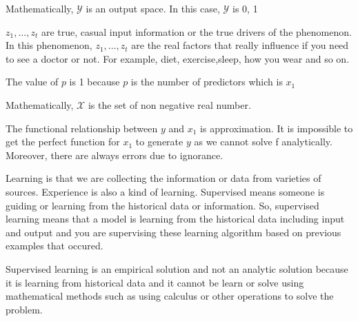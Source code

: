 \documentclass[12pt]{article}
\begin{document}
\begin{enumerate}
Mathematically, $\mathcal{Y}$ is an output space. In this case, $\mathcal{Y}$ is {0, 1}


$z_1, \ldots, z_t$ are true, casual input information or the true drivers of the phenomenon. In this phenomenon, $z_1, \ldots, z_t$ are the real factors that really influence if you need to see a doctor or not. For example, diet, exercise,sleep, how you wear and so on.


The value of $p$ is 1 because $p$ is the number of predictors which is $x_1$



Mathematically, $\mathcal{X}$ is the set of non negative real number.


The functional relationship between $y$ and $x_1$ is approximation. It is impossible to get the perfect function for $x_1$ to generate $y$ as we cannot solve f analytically. Moreover, there are always errors due to ignorance.


Learning is that we are collecting the information or data from varieties of sources. Experience is also a kind of learning. Supervised means someone is guiding or learning from the historical data or information. So, supervised learning means that a model is learning from the historical data including input and output and you are supervising these learning algorithm based on previous examples that occured.


Supervised learning is an empirical solution and not an analytic solution because it is learning from historical data and it cannot be learn or solve using mathematical methods such as using calculus or other operations to solve the problem.


\end{enumerate}
\end{document}
